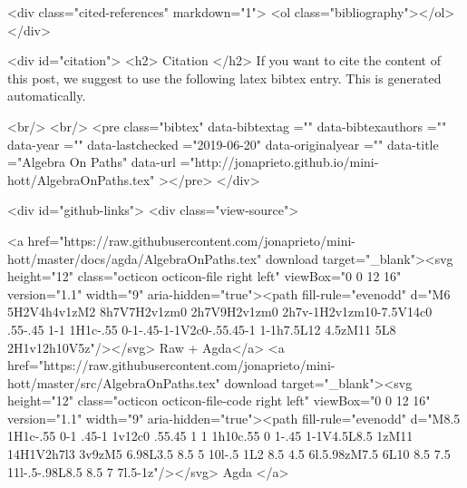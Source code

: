   <div class="cited-references" markdown="1">
  <ol class="bibliography"></ol>
  </div>


  
  <div id="citation">
  <h2> Citation </h2>
  If you want to cite the content of this post,
  we suggest to use the following latex bibtex entry.
  This is generated automatically.

  <br/>
  <br/>
  <pre class="bibtex"
       data-bibtextag =""
       data-bibtexauthors =""
       data-year =""
       data-lastchecked ="2019-06-20"
       data-originalyear =""
       data-title ="Algebra On Paths"
       data-url ="http://jonaprieto.github.io/mini-hott/AlgebraOnPaths.tex"
  ></pre>
  </div>
  

  <div id="github-links">
    <div class="view-source">
      
        <a href="https://raw.githubusercontent.com/jonaprieto/mini-hott/master/docs/agda/AlgebraOnPaths.tex" download target="_blank"><svg height="12" class="octicon octicon-file right left" viewBox="0 0 12 16" version="1.1" width="9" aria-hidden="true"><path fill-rule="evenodd" d="M6 5H2V4h4v1zM2 8h7V7H2v1zm0 2h7V9H2v1zm0 2h7v-1H2v1zm10-7.5V14c0 .55-.45 1-1 1H1c-.55 0-1-.45-1-1V2c0-.55.45-1 1-1h7.5L12 4.5zM11 5L8 2H1v12h10V5z"/></svg> Raw + Agda</a>
        <a href="https://raw.githubusercontent.com/jonaprieto/mini-hott/master/src/AlgebraOnPaths.tex" download target="_blank"><svg height="12" class="octicon octicon-file-code right left" viewBox="0 0 12 16" version="1.1" width="9" aria-hidden="true"><path fill-rule="evenodd" d="M8.5 1H1c-.55 0-1 .45-1 1v12c0 .55.45 1 1 1h10c.55 0 1-.45 1-1V4.5L8.5 1zM11 14H1V2h7l3 3v9zM5 6.98L3.5 8.5 5 10l-.5 1L2 8.5 4.5 6l.5.98zM7.5 6L10 8.5 7.5 11l-.5-.98L8.5 8.5 7 7l.5-1z"/></svg> Agda </a>
      
